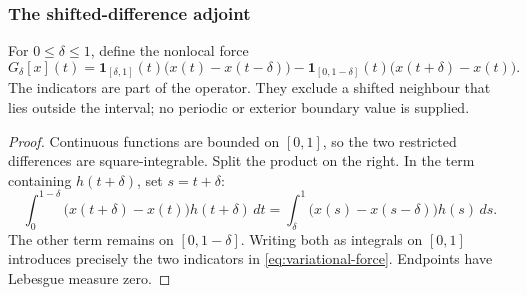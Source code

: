 \subsubsection{The shifted-difference adjoint}
\label{sec:variational-shift}

For $0\le\delta\le1$, define the nonlocal force
\begin{equation}\label{eq:variational-force}
 G_\delta[x](t)
 =\mathbf1_{[\delta,1]}(t)\bigl(x(t)-x(t-\delta)\bigr)
  -\mathbf1_{[0,1-\delta]}(t)\bigl(x(t+\delta)-x(t)\bigr).
\end{equation}
The indicators are part of the operator. They exclude a shifted
neighbour that lies outside the interval; no periodic or exterior
boundary value is supplied.

\begin{proof}
Continuous functions are bounded on $[0,1]$, so the two restricted
differences are square-integrable. Split the product on the right.
In the term containing $h(t+\delta)$, set $s=t+\delta$:
\[
 \int_0^{1-\delta}\!\bigl(x(t+\delta)-x(t)\bigr)h(t+\delta)\,dt
 =\int_\delta^1\!\bigl(x(s)-x(s-\delta)\bigr)h(s)\,ds.
\]
The other term remains on $[0,1-\delta]$. Writing both as
integrals on $[0,1]$ introduces precisely the two indicators in
\eqref{eq:variational-force}. Endpoints have Lebesgue measure zero.
\end{proof}
